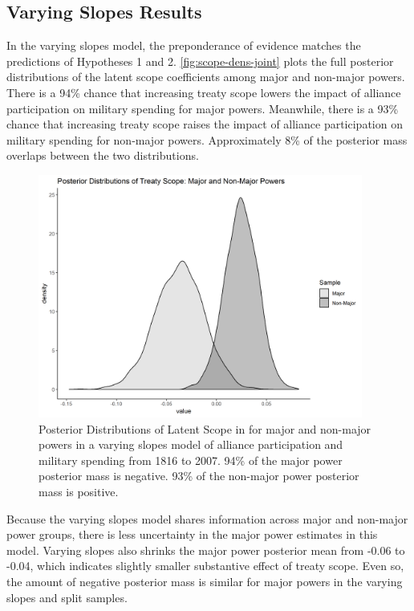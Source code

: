 \documentclass[12pt]{article}
\begin{document}
\subsection{Varying Slopes Results}


In the varying slopes model, the preponderance of evidence matches the predictions of Hypotheses 1 and 2. 
\autoref{fig:scope-dens-joint} plots the full posterior distributions of the latent scope coefficients among major and non-major powers. 
There is a 94\% chance that increasing treaty scope lowers the impact of alliance participation on military spending for major powers. 
Meanwhile, there is a 93\% chance that increasing treaty scope raises the impact of alliance participation on military spending for non-major powers. 
Approximately 8\% of the posterior mass overlaps between the two distributions. 


\begin{figure}[htbp]
	\centering
		\includegraphics[width=0.95\textwidth]{scope-dens-joint.png}
	\caption{Posterior Distributions of Latent Scope in for major and non-major powers in a varying slopes model of alliance participation and military spending from 1816 to 2007. 94\% of the major power posterior mass is negative. 93\% of the non-major power posterior mass is positive.}
	\label{fig:scope-dens-joint}
\end{figure}


Because the varying slopes model shares information across major and non-major power groups, there is less uncertainty in the major power estimates in this model. 
Varying slopes also shrinks the major power posterior mean from -0.06 to -0.04, which indicates slightly smaller substantive effect of treaty scope. 
Even so, the amount of negative posterior mass is similar for major powers in the varying slopes and split samples. 
\end{document}
